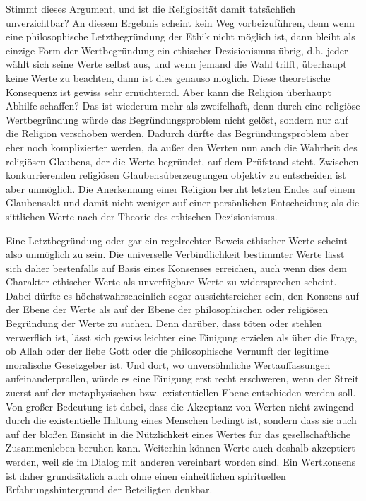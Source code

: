 Stimmt dieses Argument, und ist die Religiosität damit tatsächlich
unverzichtbar?  An diesem Ergebnis scheint kein Weg vorbeizuführen, denn wenn
eine philosophische Letztbegründung der Ethik nicht möglich ist, dann bleibt
als einzige Form der Wertbegründung ein ethischer Dezisionismus übrig, d.h.
jeder wählt sich seine Werte selbst aus, und wenn jemand die Wahl trifft,
überhaupt keine Werte zu beachten, dann ist dies genauso möglich. Diese
theoretische Konsequenz ist gewiss sehr ernüchternd. Aber kann die Religion
überhaupt Abhilfe schaffen? Das ist wiederum mehr als zweifelhaft, denn durch
eine religiöse Wertbegründung würde das Begründungsproblem nicht gelöst,
sondern nur auf die Religion verschoben werden. Dadurch dürfte das
Begründungsproblem aber eher noch komplizierter werden, da außer den Werten
nun auch die Wahrheit des religiösen Glaubens, der die Werte begründet, auf
dem Prüfstand steht.  Zwischen konkurrierenden religiösen Glaubensüberzeugungen
objektiv zu entscheiden ist aber unmöglich. Die Anerkennung einer Religion
beruht letzten Endes auf einem Glaubensakt und damit nicht weniger auf einer
persönlichen Entscheidung als die sittlichen Werte nach der Theorie des
ethischen Dezisionismus.

Eine Letztbegründung oder gar ein regelrechter Beweis ethischer Werte scheint
also unmöglich zu sein. Die universelle Verbindlichkeit bestimmter Werte lässt
sich daher bestenfalls auf Basis eines Konsenses erreichen, auch wenn dies dem
Charakter ethischer Werte als unverfügbare Werte zu widersprechen scheint.
Dabei dürfte es höchstwahrscheinlich sogar aussichtsreicher sein, den Konsens
auf der Ebene der Werte als auf der Ebene der philosophischen oder religiösen
Begründung der Werte zu suchen. Denn darüber, dass töten oder stehlen
verwerflich ist, lässt sich gewiss leichter eine Einigung erzielen als über
die Frage, ob Allah oder der liebe Gott oder die philosophische Vernunft der
legitime moralische Gesetzgeber ist. Und dort, wo unversöhnliche
Wertauffassungen aufeinanderprallen, würde es eine Einigung erst recht
erschweren, wenn der Streit zuerst auf der metaphysischen bzw. existentiellen
Ebene entschieden werden soll. Von großer Bedeutung ist dabei, dass die
Akzeptanz von Werten nicht zwingend durch die existentielle Haltung eines
Menschen bedingt ist, sondern dass sie auch auf der bloßen Einsicht in die
Nützlichkeit eines Wertes für das gesellschaftliche Zusammenleben beruhen
kann. Weiterhin können Werte auch deshalb akzeptiert werden, weil sie im
Dialog mit anderen vereinbart worden sind. Ein Wertkonsens ist daher
grundsätzlich auch ohne einen einheitlichen spirituellen Erfahrungshintergrund
der Beteiligten denkbar.

